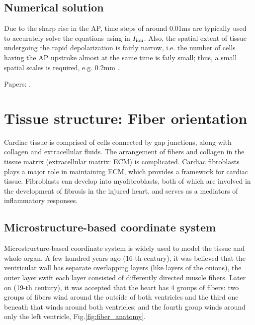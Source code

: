 \subsection{Numerical solution}

Due to the sharp rise in the AP, time steps of around 0.01ms are typically used
to accurately solve the equations using in $I_{\text{ion}}$. Also, the spatial extent
of tissue undergoing the rapid depolarization is fairly narrow, i.e. the number
of cells having the AP upstroke almost at the same time is faily small; thus, a
small spatial scales is required, e.g. 0.2mm \citep{lines2003}.

Papers: \citep{henriquez1990, henriquez1993, muzikant1998, huang1999,
henriquez2009bidomain}.


\section{Tissue structure: Fiber orientation}
\label{sec:fiber_orientation}


Cardiac tissue is comprised of cells connected by gap junctions, along with
collagen and extracellular fluids. The arrangement of fibers and collagen in the
tissue matrix (extracellular matrix: ECM) is complicated.  Cardiac fibroblasts
plays a major role in maintaining ECM, which provides a framework for cardiac
tissue. Fibroblasts can develop into myofibroblasts, both of which are involved
in the development of fibrosis in the injured heart, and serves as a mediators
of inflammatory responses.

\subsection{Microstructure-based coordinate system}
 
Microstructure-based coordinate system is widely used to model the tissue and
whole-organ. A few hundred years ago (16-th century), it was believed that the
ventricular wall has separate overlapping layers (like layers of the onions),
the outer layer swift each layer consisted of differently directed muscle
fibers. Later on (19-th century), it was accepted that the heart has 4 groups
of fibers: two groups of fibers wind around the outside of both ventricles and
the third one beneath that winds around both ventricles; and the fourth group
winds around only the left ventricle, Fig.\ref{fig:fiber_anatomy}.

